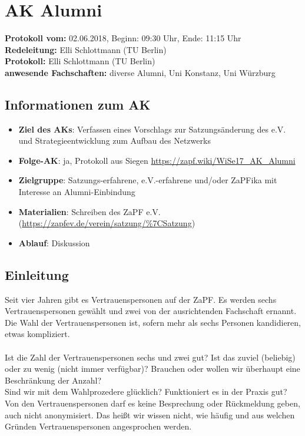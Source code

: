 
\section{AK Alumni}

  \textbf{Protokoll vom:} 02.06.2018,
  Beginn: 09:30 Uhr,
  Ende: 11:15 Uhr \\
  \textbf{Redeleitung:} Elli Schlottmann (TU Berlin) \\
  \textbf{Protokoll:} Elli Schlottmann (TU Berlin) \\
  \textbf{anwesende Fachschaften:} diverse Alumni, Uni Konstanz, Uni Würzburg

  \subsection*{Informationen zum AK}
    \begin{itemize}
      \item \textbf{Ziel des AKs}: Verfassen eines Vorschlags zur Satzungsänderung des e.V. und Strategieentwicklung zum Aufbau des Netzwerks
      \item \textbf{Folge-AK}: ja, Protokoll aus Siegen \url{https://zapf.wiki/WiSe17_AK_Alumni}
      \item \textbf{Zielgruppe}: Satzungs-erfahrene, e.V.-erfahrene und/oder ZaPFika mit Interesse an Alumni-Einbindung
      \item \textbf{Materialien}: Schreiben des ZaPF e.V. (\url{https://zapfev.de/verein/satzung/%7CSatzung})
      \item \textbf{Ablauf}: Diskussion
    \end{itemize}

  \subsection*{Einleitung}
    Seit vier Jahren gibt es Vertrauenspersonen auf der ZaPF. Es werden sechs Vertrauenspersonen gewählt und zwei von der ausrichtenden Fachschaft ernannt. Die Wahl der Vertrauenspersonen ist, sofern mehr als sechs Personen kandidieren, etwas kompliziert. \\ \\

    Ist die Zahl der Vertrauenspersonen sechs und zwei gut? Ist das zuviel (beliebig) oder zu wenig (nicht immer verfügbar)? Brauchen oder wollen wir überhaupt eine Beschränkung der Anzahl? \\
    Sind wir mit dem Wahlprozedere glücklich? Funktioniert es in der Praxis gut? \\
    Von den Vertrauenspersonen darf es keine Besprechung oder Rückmeldung geben, auch nicht anonymisiert. Das heißt wir wissen nicht, wie häufig und aus welchen Gründen Vertrauenspersonen angesprochen werden. \\ \\

